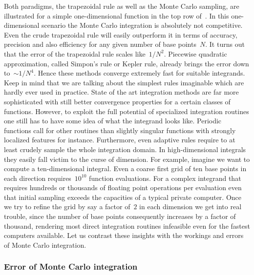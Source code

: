 Both paradigms, the trapezoidal rule as well as the Monte Carlo sampling, are
illustrated for a simple one-dimensional function in the top row
of~. In this one-dimensional scenario the Monte Carlo
integration is absolutely not competitive. Even the crude trapezoidal rule will
easily outperform it in terms of accuracy, precision and also efficiency for any
given number of base points~$N$. It turns out that the error of the trapezoidal
rule scales like~$1/N^2$. Piecewise quadratic approximation, called Simpon's
rule or Kepler rule, already brings the error down to~$\sim 1/N^4$. Hence these
methods converge extremely fast for suitable integrands. Keep in mind that we
are talking about the simplest rules imaginable which are hardly ever used in
practice. State of the art integration methods are far more sophisticated
with still better convergence properties for a certain classes of functions.
However, to exploit the full potential of specialized integration routines one
still has to have some idea of what the integrand looks like. Periodic functions
call for other routines than slightly singular functions with strongly localized
features for instance. Furthermore, even adaptive rules require to at least
crudely sample the whole integration domain. In high-dimensional integrals they
easily fall victim to the curse of dimension. For example, imagine we want to
compute a ten-dimensional integral. Even a coarse first grid of ten base points
in each direction requires~$10^{10}$ function evaluations. For a complex
integrand that requires hundreds or thousands of floating point operations per
evaluation even that initial sampling exceeds the capacities of a typical
private computer. Once we try to refine the grid by say a factor of~$2$ in each
dimension we get into real trouble, since the number of base points consequently
increases by a factor of thousand, rendering most direct integration routines
infeasible even for the fastest computers available. Let us contrast these
insights with the workings and errors of Monte Carlo integration.

\subsubsection{Error of Monte Carlo integration}

